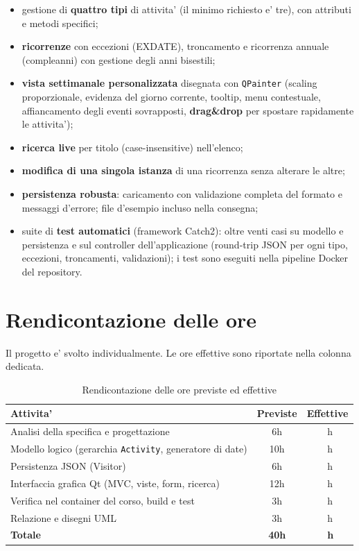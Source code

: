 \documentclass[10pt,a4paper]{article}
\begin{document}
\begin{itemize}[nosep]
  \item gestione di \textbf{quattro tipi} di attivita' (il minimo richiesto e'
    tre), con attributi e metodi specifici;
  \item \textbf{ricorrenze} con eccezioni (EXDATE), troncamento e ricorrenza
    annuale (compleanni) con gestione degli anni bisestili;
  \item \textbf{vista settimanale personalizzata} disegnata con \texttt{QPainter}
    (scaling proporzionale, evidenza del giorno corrente, tooltip, menu
    contestuale, affiancamento degli eventi sovrapposti, \textbf{drag\&drop}
    per spostare rapidamente le attivita');
  \item \textbf{ricerca live} per titolo (case-insensitive) nell'elenco;
  \item \textbf{modifica di una singola istanza} di una ricorrenza senza
    alterare le altre;
  \item \textbf{persistenza robusta}: caricamento con validazione completa del
    formato e messaggi d'errore; file d'esempio incluso nella consegna;
  \item suite di \textbf{test automatici} (framework Catch2): oltre venti casi
    su modello e persistenza e sul controller dell'applicazione (round-trip
    JSON per ogni tipo, eccezioni, troncamenti, validazioni); i test sono
    eseguiti nella pipeline Docker del repository.
\end{itemize}

\section{Rendicontazione delle ore}

Il progetto e' svolto individualmente. Le ore effettive sono riportate nella
colonna dedicata.

\begin{table}[h]
\centering
\begin{tabular}{@{}l c c@{}}
\toprule
\textbf{Attivita'} & \textbf{Previste} & \textbf{Effettive} \\
\midrule
Analisi della specifica e progettazione & 6h & ~h \\
Modello logico (gerarchia \texttt{Activity}, generatore di date) & 10h & ~h \\
Persistenza JSON (Visitor) & 6h & ~h \\
Interfaccia grafica Qt (MVC, viste, form, ricerca) & 12h & ~h \\
Verifica nel container del corso, build e test & 3h & ~h \\
Relazione e disegni UML & 3h & ~h \\
\midrule
\textbf{Totale} & \textbf{40h} & \textbf{~h} \\
\bottomrule
\end{tabular}
\caption{Rendicontazione delle ore previste ed effettive}
\label{tab:ore}
\end{table}
\end{document}

